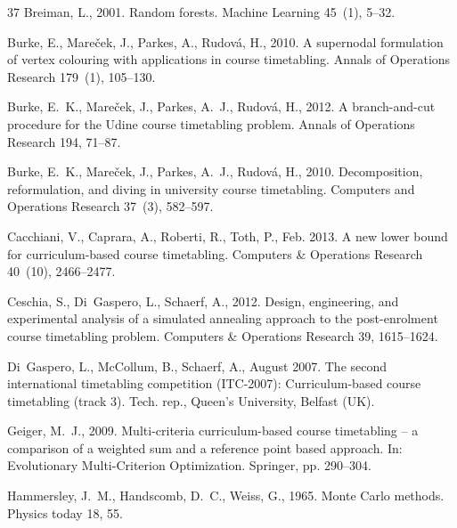 \documentclass[authoryear,12pt]{article}
\begin{document}
\begin{thebibliography}{37}
Breiman, L., 2001. Random forests. Machine Learning 45~(1), 5--32.

Burke, E., Mare{\v c}ek, J., Parkes, A., Rudov\'a, H., 2010{}. A
  supernodal formulation of vertex colouring with applications in course
  timetabling. Annals of Operations Research 179~(1), 105--130.

Burke, E.~K., Mare{\v{c}}ek, J., Parkes, A.~J., Rudov{\'a}, H., 2012. A
  branch-and-cut procedure for the {U}dine course timetabling problem. Annals
  of Operations Research 194, 71--87.

Burke, E.~K., Mare\v{c}ek, J., Parkes, A.~J., Rudov\'a, H., 2010{}.
  Decomposition, reformulation, and diving in university course timetabling.
  Computers and Operations Research 37~(3), 582--597.

Cacchiani, V., Caprara, A., Roberti, R., Toth, P., Feb. 2013. A new lower bound
  for curriculum-based course timetabling. Computers \& Operations Research
  40~(10), 2466--2477.

Ceschia, S., Di~Gaspero, L., Schaerf, A., 2012. Design, engineering, and
  experimental analysis of a simulated annealing approach to the post-enrolment
  course timetabling problem. Computers \& Operations Research 39, 1615--1624.

Di~Gaspero, L., McCollum, B., Schaerf, A., August 2007. The second
  international timetabling competition ({ITC}-2007): Curriculum-based course
  timetabling (track 3). Tech. rep., Queen's University, Belfast (UK).

Geiger, M.~J., 2009. Multi-criteria curriculum-based course timetabling -- a
  comparison of a weighted sum and a reference point based approach. In:
  Evolutionary Multi-Criterion Optimization. Springer, pp. 290--304.

Hammersley, J.~M., Handscomb, D.~C., Weiss, G., 1965. Monte {C}arlo methods.
  Physics today 18, 55.


\end{thebibliography}
\end{document}
